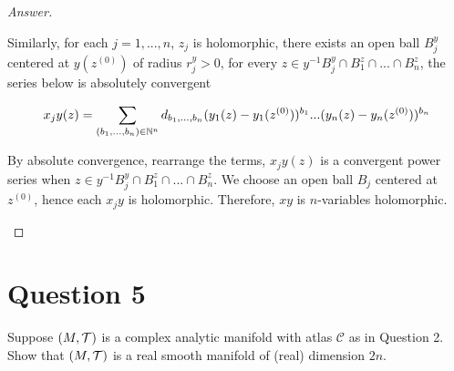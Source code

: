 \documentclass{article}
\begin{document}
\begin{proof}[Answer]
\begin{enumerate}
        Similarly, for each $j=1, ..., n$, $z_j$ is holomorphic, there exists an open ball $B^y_j$ centered at $y(z^{(0)})$ of radius $r^y_j > 0$, for every $z \in y^{-1} B^y_j \cap B^z_1 \cap ... \cap B^z_n$, the series below is absolutely convergent

        $$
            x_j y(z) = \sum_{(b_1,...,b_n) \in \mathbb{N}^n} d_{b_1,...,b_n} (y_1(z) - y_1(z^{(0)}))^{b_1} ... (y_n(z) - y_n(z^{(0)}))^{b_n}
        $$

        By absolute convergence, rearrange the terms, $x_j y(z)$ is a convergent power series when $z \in y^{-1} B^y_j \cap B^z_1 \cap ... \cap B^z_n$. We choose an open ball $B_j$ centered at $z^{(0)}$, hence each $x_j y$ is holomorphic. Therefore, $xy$ is $n$-variables holomorphic.
        
    \end{enumerate}
\end{proof}

\section{Question 5}
Suppose $(M,\mathcal{T})$ is a complex analytic manifold with atlas $\mathcal{C}$ as in Question 2.
Show that $(M,\mathcal{T})$ is a real smooth manifold of (real) dimension $2n$.
\end{document}
